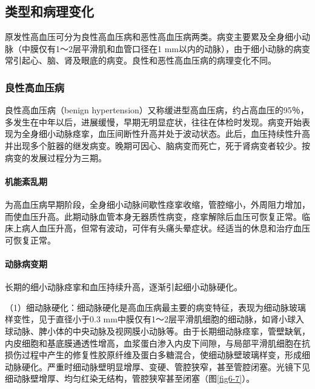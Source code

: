 \subsection{类型和病理变化}

原发性高血压可分为良性高血压病和恶性高血压病两类。病变主要累及全身细小动脉（中膜仅有1～2层平滑肌和血管口径在1
mm以内的动脉），由于细小动脉的病变常引起心、脑、肾及眼底的病变。良性和恶性高血压病的病理变化不同。

\subsubsection{良性高血压病}

良性高血压病（benign
hypertension）又称缓进型高血压病，约占高血压的95％，多发生在中年以后，进展缓慢，早期无明显症状，往往在体检时发现。病变开始表现为全身细小动脉痉挛，血压间断性升高并处于波动状态。此后，血压持续性升高并出现多个脏器的继发病变。晚期可因心、脑病变而死亡，死于肾病变者较少。按病变的发展过程分为三期。

\paragraph{机能紊乱期}
为高血压病早期阶段，全身细小动脉间歇性痉挛收缩，管腔缩小，外周阻力增加，而使血压升高。此期动脉血管本身无器质性病变，痉挛解除后血压可恢复正常。临床上病人血压升高，但常有波动，可伴有头痛头晕症状。经适当的休息和治疗血压可恢复正常。

\paragraph{动脉病变期}
长期的细小动脉痉挛和血压持续升高，逐渐引起细小动脉硬化。

（1）细动脉硬化：细动脉硬化是高血压病最主要的病变特征，表现为细动脉玻璃样变性，见于直径小于0.3
mm中膜仅有1～2层平滑肌细胞的细动脉，如肾小球入球动脉、脾小体的中央动脉及视网膜小动脉等。由于长期细动脉痉挛，管壁缺氧，内皮细胞和基底膜通透性增高，血浆蛋白渗入内皮下间隙，与局部平滑肌细胞在抗损伤过程中产生的修复性胶原纤维及蛋白多糖混合，使细动脉壁玻璃样变，形成细动脉硬化。严重时细动脉壁明显增厚、变硬、管腔狭窄，甚至管腔闭塞。光镜下见细动脉壁增厚、均匀红染无结构，管腔狭窄甚至闭塞（图\ref{fig6-7}）。

